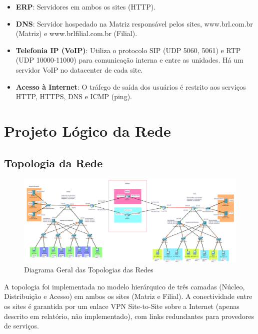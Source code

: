 \documentclass[a4paper, 12pt]{article}
\begin{document}
\begin{itemize}
    \item \textbf{ERP}: Servidores em ambos os sites (HTTP).
    \item \textbf{DNS}: Servidor hospedado na Matriz responsável pelos sites, www.brl.com.br (Matriz) e www.brlfilial.com.br (Filial).
    \item \textbf{Telefonia IP (VoIP)}: Utiliza o protocolo SIP (UDP 5060, 5061) e RTP (UDP 10000-11000) para comunicação interna e entre as unidades. Há um servidor VoIP no datacenter de cada site.
    \item \textbf{Acesso à Internet}: O tráfego de saída dos usuários é restrito aos serviços HTTP, HTTPS, DNS e ICMP (ping).
\end{itemize}

\section{Projeto Lógico da Rede}
\label{sec:projeto-logico}

\subsection{Topologia da Rede}
\label{subsec:topologia}

\begin{figure}[H]
    \centering
    \includegraphics[width=1\linewidth]{geral.png}
        \caption{Diagrama Geral das Topologias das Redes}
    \label{fig:geral}
\end{figure}

A topologia foi implementada no modelo hierárquico de três camadas (Núcleo, Distribuição e Acesso) em ambos os sites (Matriz e Filial). A conectividade entre os sites é garantida por um enlace VPN Site-to-Site sobre a Internet (apenas descrito em relatório, não implementado), com links redundantes para provedores de serviços.
\end{document}
